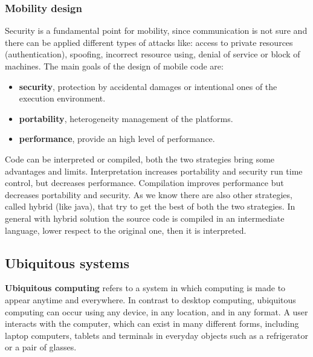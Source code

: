 \subsubsection{Mobility design}
Security is a fundamental point for mobility, since communication is not sure and there can be applied different types of attacks like: access to private resources (authentication), spoofing, incorrect resource using, denial of service or block of machines.
The main goals of the design of mobile code are:

\begin{itemize}
	\item \textbf{security}, protection by accidental damages or intentional ones of the execution environment.
	\item \textbf{portability}, heterogeneity management of the platforms.
	\item \textbf{performance}, provide an high level of performance.
\end{itemize}
Code can be interpreted or compiled, both the two strategies bring some advantages and limits. Interpretation increases portability and security run time control, but decreases performance. Compilation improves performance but decreases portability and security. As we know there are also other strategies, called hybrid (like java), that try to get the best of both the two strategies. In general with hybrid solution the source code is compiled in an intermediate language, lower respect to the original one, then it is interpreted.

\subsection{Ubiquitous systems}
\textbf{Ubiquitous computing} refers to a system in which computing is made to appear anytime and everywhere. In contrast to desktop computing, ubiquitous computing can occur using any device, in any location, and in any format. A user interacts with the computer, which can exist in many different forms, including laptop computers, tablets and terminals in everyday objects such as a refrigerator or a pair of glasses. 